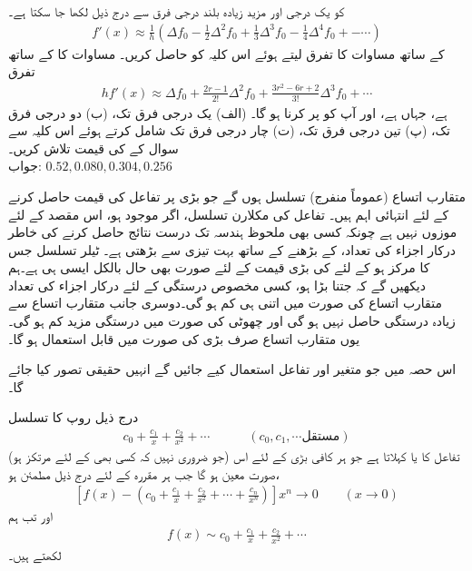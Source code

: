  کو یک درجی اور مزید زیادہ بلند درجی فرق سے درج ذیل لکھا جا سکتا ہے۔ 
\begin{align*}
f'(x)\approx \frac{1}{h}(\Delta f_0-\frac{1}{2}\Delta^2 f_0+\frac{1}{3}\Delta^3f_0-\frac{1}{4}\Delta^4 f_0+-\cdots)
\end{align*}
 کے ساتھ مساوات  کا  تفرق لیتے ہوئے اس کلیہ کو حاصل کریں۔ مساوات  کا  کے ساتھ تفرق
\begin{align*}
hf'(x)\approx \Delta f_0+\frac{2r-1}{2!}\Delta^2 f_0+\frac{3r^2-6r+2}{3!}\Delta^3f_0+\cdots
\end{align*}
ہے،  جہاں  ہے، اور آپ کو  پر کرنا ہو گا۔ (الف) یک درجی فرق تک، (ب) دو درجی فرق تک، (پ) تین درجی فرق تک، (ت) چار درجی فرق تک  شامل کرتے ہوئے  اس کلیہ سے  سوال  کے  کی قیمت تلاش کریں۔ \\
جواب:\quad
$0.52, 0.080, 0.304, 0.256$

متقارب اتساع (عموماً منفرج) تسلسل ہوں گے جو بڑی  پر تفاعل  کی قیمت حاصل کرنے کے  لئے  انتہائی اہم ہیں۔ تفاعل  کی مکلارن تسلسل، اگر موجود ہو،  اس مقصد کے لئے موزوں نہیں ہے چونکہ  کسی بھی ملحوظ ہندسہ تک درست نتائج حاصل کرنے کی خاطر درکار اجزاء کی تعداد،  کے بڑھنے کے ساتھ بہت تیزی سے بڑھتی ہے۔ ٹیلر تسلسل جس کا مرکز  ہو کے لئے  کی بڑی قیمت کے لئے صورت بھی حال بالکل ایسی ہی ہے۔ہم دیکھیں گے کہ  جتنا بڑا ہو، کسی مخصوص درستگی کے لئے درکار اجزاء کی تعداد متقارب اتساع کی صورت میں اتنی ہی کم ہو گی۔دوسری جانب متقارب اتساع سے زیادہ درستگی حاصل نہیں ہو گی اور چھوٹی  کی صورت میں درستگی مزید کم ہو گی۔یوں متقارب اتساع صرف بڑی  کی صورت میں قابل استعمال ہو گا۔

اس حصہ میں جو متغیر اور تفاعل استعمال کیے جائیں گے انہیں حقیقی تصور کیا جائے گا۔

درج ذیل روپ کا تسلسل 
\begin{align*}
c_0+\frac{c_1}{x}+\frac{c_2}{x^2}+\cdots\quad\quad\quad (c_0,c_1,\cdots \text{مستقل})
\end{align*}
(جو ضروری نہیں کہ کسی بھی  کے لئے مرتکز ہو) تفاعل  کا   یا  کہلاتا ہے جو ہر کافی بڑی  کے لئے اس صورت معین ہو گا جب ہر مقررہ  کے لئے درج ذیل مطمئن ہو،
\begin{align}\label{مساوات_اعدادی_متقارب_الف}
[f(x)-(c_0+\frac{c_1}{x}+\frac{c_2}{x^2}+\cdots+\frac{c_n}{x^n})]x^n\to 0  \quad \quad (x\to 0) 
\end{align}
اور تب ہم
\begin{align*}
f(x) \sim c_0+\frac{c_1}{x}+\frac{c_2}{x^2}+\cdots
\end{align*}
لکھتے ہیں۔

